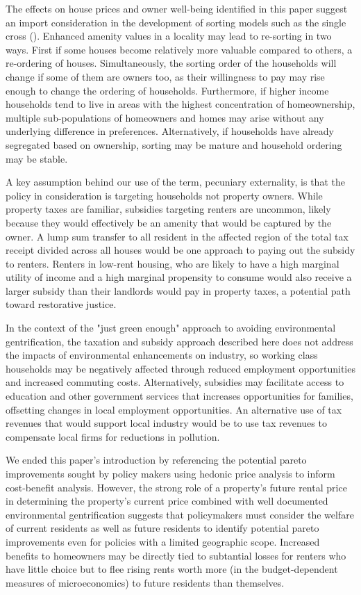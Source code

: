 \documentclass[ecta,nameyear,draft]{econsocart}
\theoremstyle{plain}
\theoremstyle{remark}
\begin{document}
The effects on house prices and owner well-being identified in this paper suggest an import consideration in the development of sorting models such as the single cross (\cite{banzhaf20}). Enhanced amenity values in a locality may lead to re-sorting in two ways. First if some houses become relatively more valuable compared to others, a re-ordering of houses. Simultaneously, the sorting order of the households will change if some of them are owners too, as their willingness to pay may rise enough to change the ordering of households. Furthermore, if higher income households tend to live in areas with the highest concentration of homeownership, multiple sub-populations of homeowners and homes may arise without any underlying difference in preferences. Alternatively, if households have already segregated based on ownership, sorting may be mature and household ordering may be stable.

A key assumption behind our use of the term, pecuniary externality, is that the policy in consideration is targeting households not property owners. While property taxes are familiar, subsidies targeting renters are uncommon, likely because they would effectively be an amenity that would be captured by the owner. A lump sum transfer to all resident in the affected region of the total tax receipt divided across all houses would be one approach to paying out the subsidy to renters. Renters in low-rent housing, who are likely to have a high marginal utility of income and a high marginal propensity to consume would also receive a larger subsidy than their landlords would pay in property taxes, a potential path toward restorative justice. 

In the context of the "just green enough" \cite{curran12} approach to avoiding environmental gentrification, the taxation and subsidy approach described here does not address the impacts of environmental enhancements on industry, so working class households may be negatively affected through reduced employment opportunities and increased commuting costs. Alternatively, subsidies may facilitate access to education and other government services that increases opportunities for families, offsetting changes in local employment opportunities. An alternative use of tax revenues that would support local industry would be to use tax revenues to compensate local firms for reductions in pollution.

We ended this paper's introduction by referencing the potential pareto improvements sought by policy makers using hedonic price analysis to inform cost-benefit analysis. However, the strong role of a property's future rental price in determining the property's current price combined with well documented environmental gentrification suggests that policymakers must consider the welfare of current residents as well as future residents to identify potential pareto improvements even for policies with a limited geographic scope. Increased benefits to homeowners may be directly tied to subtantial losses for renters who have little choice but to flee rising rents worth more (in the budget-dependent measures of microeconomics) to future residents than themselves.
\end{document}
